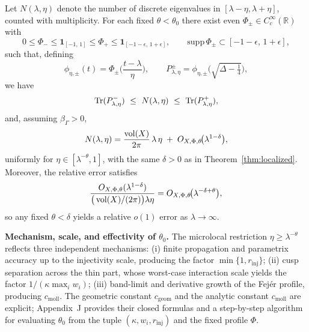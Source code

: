 \begin{theorem}\label{thm:local-weyl}
Let $N(\lambda,\eta)$ denote the number of discrete eigenvalues in $[\lambda-\eta,\lambda+\eta]$, counted with multiplicity. For each fixed $\theta<\theta_0$ there exist even $\Phi_\pm\in C_c^\infty(\mathbb{R})$ with
\[
0\le\Phi_-\le\mathbf{1}_{[-1,\,1]}\le\Phi_+\le\mathbf{1}_{[-1-\epsilon,\,1+\epsilon]},\qquad \mathrm{supp}\,\Phi_\pm\subset[-1-\epsilon,\,1+\epsilon],
\]
such that, defining
\[
\phi_{\eta,\pm}(t)=\Phi_\pm\!\Big(\frac{t-\lambda}{\eta}\Big),\qquad 
P^\pm_{\lambda,\eta}=\phi_{\eta,\pm}\!\Big(\sqrt{\Delta-\tfrac14}\Big),
\]
we have
\begin{equation}\label{eq:tauber}
\Tr(P^-_{\lambda,\eta})\ \le\ N(\lambda,\eta)\ \le\ \Tr(P^+_{\lambda,\eta}),
\end{equation}
and, assuming $\beta_\Gamma>0$,
\begin{equation}\label{eq:local-weyl}
N(\lambda,\eta) = \frac{\operatorname{vol}(X)}{2\pi}\,\lambda\,\eta \;+\; O_{X,\Phi,\theta}\!\big(\lambda^{1-\delta}\big),
\end{equation}
uniformly for $\eta\in[\lambda^{-\theta},1]$, with the same $\delta>0$ as in Theorem~\ref{thm:localized}. Moreover, the relative error satisfies
\begin{equation}\label{eq:relative}
\frac{O_{X,\Phi,\theta}(\lambda^{1-\delta})}{\big(\operatorname{vol}(X)/(2\pi)\big)\lambda\eta} = O_{X,\Phi,\theta}\!\big(\lambda^{-\delta+\theta}\big),
\end{equation}
so any fixed $\theta<\delta$ yields a relative $o(1)$ error as $\lambda\to\infty$.
\end{theorem}

\medskip
\noindent\textbf{Mechanism, scale, and effectivity of $\theta_0$.}
The microlocal restriction $\eta\ge\lambda^{-\theta}$ reflects three independent mechanisms:
(i) finite propagation and parametrix accuracy up to the injectivity scale, producing the factor $\min\{1,r_{\mathrm{inj}}\}$; (ii) cusp separation across the thin part, whose worst-case interaction scale yields the factor $1/(\kappa\max_i w_i)$; (iii) band-limit and derivative growth of the Fejér profile, producing $c_{\mathrm{moll}}$. The geometric constant $c_{\mathrm{geom}}$ and the analytic constant $c_{\mathrm{moll}}$ are explicit; Appendix~J provides their closed formulas and a step-by-step algorithm for evaluating $\theta_0$ from the tuple $(\kappa,{w_i},r_{\mathrm{inj}})$ and the fixed profile $\Phi$.

